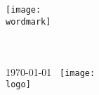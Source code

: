 \thispagestyle{empty}
\texttt{[image: \\wordmark]}

{%
  ~\sffamily
  \vfill
  {%
    \Huge\bfseries \papertitle
  }
  \bigskip
  {%
    \Large
    \firstname\,\,\surname \\[2ex]
    \papersubtitle
    \\[5ex]
    \today
  }
}
\vfill
~\hfill\texttt{[image: \\logo]}

\vspace*{-3cm}
\newpage